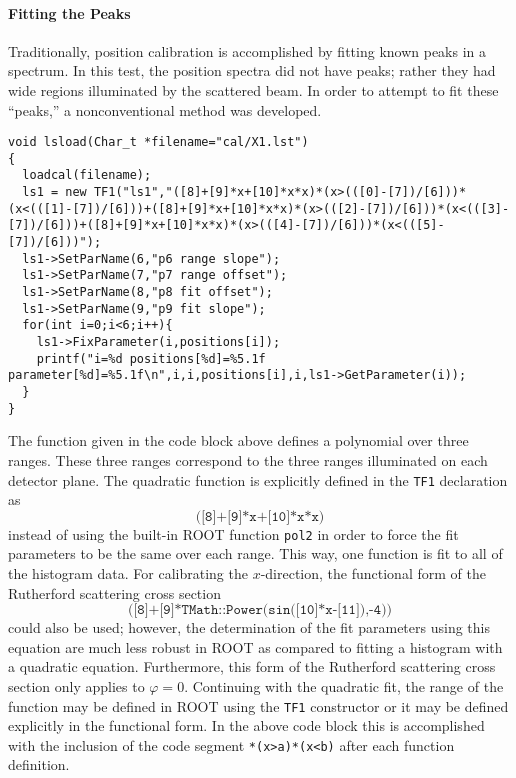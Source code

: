 \paragraph{Fitting the Peaks}
Traditionally, position calibration is accomplished by fitting known peaks in a spectrum.  In this test, the position spectra did not have peaks; rather they had wide regions illuminated by the scattered beam.  In order to attempt to fit these ``peaks,'' a nonconventional method was developed.
\vspace{0.5\baselineskip}
\par\noindent
\begin{minipage}{\linewidth}
\singlespace
\begin{lstlisting}
void lsload(Char_t *filename="cal/X1.lst")
{
  loadcal(filename);   
  ls1 = new TF1("ls1","([8]+[9]*x+[10]*x*x)*(x>(([0]-[7])/[6]))*(x<(([1]-[7])/[6]))+([8]+[9]*x+[10]*x*x)*(x>(([2]-[7])/[6]))*(x<(([3]-[7])/[6]))+([8]+[9]*x+[10]*x*x)*(x>(([4]-[7])/[6]))*(x<(([5]-[7])/[6]))");
  ls1->SetParName(6,"p6 range slope");
  ls1->SetParName(7,"p7 range offset");
  ls1->SetParName(8,"p8 fit offset");
  ls1->SetParName(9,"p9 fit slope");
  for(int i=0;i<6;i++){
    ls1->FixParameter(i,positions[i]);
    printf("i=%d positions[%d]=%5.1f parameter[%d]=%5.1f\n",i,i,positions[i],i,ls1->GetParameter(i));
  }
}  
\end{lstlisting}%
\end{minipage}
The function given in the code block above defines a polynomial over three ranges.  These three ranges correspond to the three ranges illuminated on each detector plane.  The quadratic function is explicitly defined in the \texttt{TF1} declaration as
\begin{equation}
\texttt{([8]+[9]*x+[10]*x*x)}
\label{eq:poly}
\end{equation}
instead of using the built-in ROOT function \verb|pol2| in order to force the fit parameters to be the same over each range.  This way, one function is fit to all of  the histogram data.  For calibrating the $x$-direction, the functional form of the Rutherford scattering cross section
\begin{equation}
\texttt{([8]+[9]*TMath::Power(sin([10]*x-[11]),-4))}
\label{eq:ruth}
\end{equation}
could also be used; however, the determination of the fit parameters using this equation are much less robust in ROOT as compared to fitting a histogram with a quadratic equation.  Furthermore, this form of the Rutherford scattering cross section only applies to $\varphi=0$.  Continuing with the quadratic fit, the range of the function may be defined in ROOT using the \texttt{TF1} constructor or it may be defined explicitly in the functional form.  In the above code block this is accomplished with the inclusion of the code segment \verb|*(x>a)*(x<b)| after each function definition.

